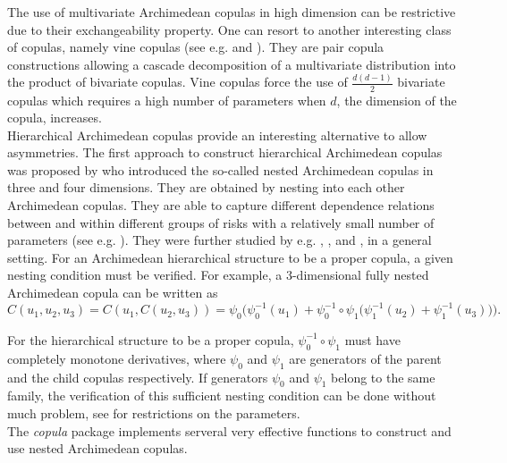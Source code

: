 \documentclass[11pt, english]{article}\usepackage[]{graphicx}\usepackage[]{color}
\begin{document}
The use of multivariate Archimedean copulas in high dimension can be
restrictive due to their exchangeability property. One can resort to
another interesting class of copulas, namely vine copulas (see e.g. \cite{bedford2002} and \cite{joe1997}). They are pair copula constructions
allowing a cascade decomposition of a multivariate distribution into the
product of bivariate copulas. Vine copulas force the use of $\frac{d(d-1)}{2%
}$ bivariate copulas which requires a high number of parameters when $d$,
the dimension of the copula, increases. \\


Hierarchical Archimedean copulas provide an interesting alternative to allow asymmetries.
The first approach to construct hierarchical Archimedean copulas was proposed by \cite{joe1997} who introduced the so-called nested Archimedean copulas in three and four dimensions. They
are obtained by nesting into each other Archimedean copulas.
They are able to capture different dependence relations between and within different
groups of risks with a relatively small number of parameters (see e.g. \cite{gorecki2016}). They were further studied by e.g. \cite{mcsample08}, \cite{hofert12eff}, and \cite{hofert11eff}, in a general setting.  For an Archimedean hierarchical structure to be a
proper copula, a given nesting condition must be verified. For example, a
3-dimensional fully nested Archimedean copula can be written as
\begin{equation*}
C(u_{1},u_{2},u_{3})=C(u_{1},C(u_{2},u_{3}))=\psi _{0}\Big(\psi
_{0}^{-1}(u_{1})+\psi _{0}^{-1}\circ \psi _{1}\big(\psi
_{1}^{-1}(u_{2})+\psi _{1}^{-1}(u_{3})\big)\Big).
\end{equation*}

For the hierarchical structure to be a proper copula, $\psi _{0}^{-1}\circ
\psi _{1}$ must have completely monotone derivatives, where $\psi _{0}$ and $%
\psi _{1}$ are generators of the parent and the child copulas respectively.
If generators $\psi _{0}$ and $\psi _{1}$ belong to the same family, the
verification of this sufficient nesting condition can be done without much
problem, see \cite{hofert} for restrictions on the parameters. \\

The \emph{copula} package implements serveral very effective functions to construct and use nested Archimedean copulas.

\newpage



\end{document}
